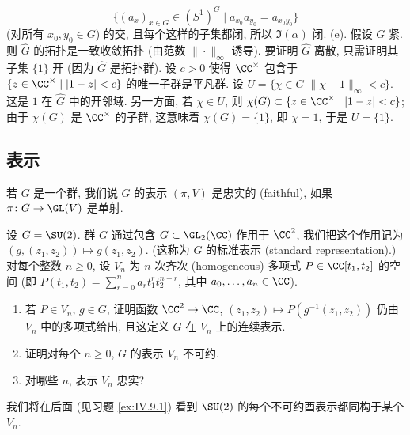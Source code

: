 \begin{solution}
\[
\{(a_x)_{x \in G} \in (S^1)^G \mid a_{x_0}a_{y_0} = a_{x_0y_0}\}
\]
(对所有 $x_0, y_0 \in G$) 的交, 且每个这样的子集都闭, 所以 $\Im(\alpha)$ 闭.
(e). 假设 $G$ 紧. 则 $\widehat{G}$ 的拓扑是一致收敛拓扑 (由范数 $\|\cdot\|_{\infty}$ 诱导). 要证明 $\widehat{G}$ 离散, 只需证明其子集 $\{1\}$ 开 (因为 $\widehat{G}$ 是拓扑群). 设 $c > 0$ 使得 $\CC^{\times}$ 包含于 $\{z \in \CC^{\times} \mid |1 - z| < c\}$ 的唯一子群是平凡群. 设 $U = \{\chi \in \widehat{G} \mid \|\chi - 1\|_{\infty} < c\}$. 这是 $1$ 在 $\widehat{G}$ 中的开邻域. 另一方面, 若 $\chi \in U$, 则 $\chi(G) \subset \{z \in \CC^{\times} \mid |1 - z| < c\}$; 由于 $\chi(G)$ 是 $\CC^{\times}$ 的子群, 这意味着 $\chi(G) = \{1\}$, 即 $\chi = 1$, 于是 $U = \{1\}$.
\end{solution}

\subsection{表示}

若 $G$ 是一个群, 我们说 $G$ 的表示 $(\pi, V)$ 是忠实的 (faithful), 如果 $\pi \colon G \to \GL(V)$ 是单射.

\begin{exercise}[$\SU(2)$ 的不可约表示]
\label{ex:I.5.5.1}
设 $G = \SU(2)$. 群 $G$ 通过包含 $G \subset \GL_2(\CC)$ 作用于 $\CC^2$, 我们把这个作用记为 $(g, (z_1, z_2)) \longmapsto g(z_1, z_2)$. (这称为 $G$ 的标准表示 (standard representation).)
对每个整数 $n \geq 0$, 设 $V_n$ 为 $n$ 次齐次 (homogeneous) 多项式 $P \in \CC[t_1, t_2]$ 的空间 (即 $P(t_1, t_2) = \sum_{r=0}^n a_rt_1^rt_2^{n-r}$, 其中 $a_0, \ldots, a_n \in \CC$).
\begin{enumerate}
\item[(a)] 若 $P \in V_n$, $g \in G$, 证明函数 $\CC^2 \to \CC$, $(z_1, z_2) \longmapsto P(g^{-1}(z_1, z_2))$ 仍由 $V_n$ 中的多项式给出, 且这定义 $G$ 在 $V_n$ 上的连续表示.
\item[(b)] 证明对每个 $n \geq 0$, $G$ 的表示 $V_n$ 不可约.
\item[(c)] 对哪些 $n$, 表示 $V_n$ 忠实?
\end{enumerate}
\end{exercise}

\begin{remarkstar}
我们将在后面 (见习题 \ref{ex:IV.9.1}) 看到 $\SU(2)$ 的每个不可约酉表示都同构于某个 $V_n$.
\end{remarkstar}


